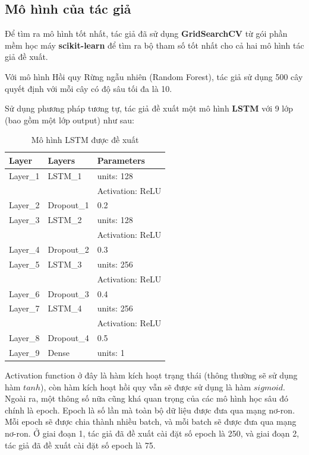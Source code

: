 \subsection{Mô hình của tác giả}
Để tìm ra mô hình tốt nhất, tác giả đã sử dụng \textbf{GridSearchCV} từ gói phần mềm học máy \textbf{scikit-learn} để tìm ra bộ tham số tốt nhất cho cả hai mô hình tác giả đề xuất. 

Với mô hình Hồi quy Rừng ngẫu nhiên (Random Forest), tác giả sử dụng 500 cây quyết định với mỗi cây có độ sâu tối đa là 10. 

Sử dụng phương pháp tương tự, tác giả đề xuất một mô hình \textbf{LSTM} với 9 lớp (bao gồm một lớp output) như sau:

\begin{table}[hbpt]
    \centering
    \begin{tabular}{lll}
    \hline
    Layer & Layers & Parameters \\
    \hline
    Layer\_1 & LSTM\_1 & units: 128 \\
    & & Activation: ReLU \\
    Layer\_2 & Dropout\_1 & 0.2 \\
    Layer\_3 & LSTM\_2 & units: 128 \\
    & & Activation: ReLU \\
    Layer\_4 & Dropout\_2 & 0.3 \\
    Layer\_5 & LSTM\_3 & units: 256 \\
    & & Activation: ReLU \\
    Layer\_6 & Dropout\_3 & 0.4 \\
    Layer\_7 & LSTM\_4 & units: 256 \\
    & & Activation: ReLU \\
    Layer\_8 & Dropout\_4 & 0.5 \\
    Layer\_9 & Dense & units: 1 \\
    \hline
    \end{tabular}
    \caption{Mô hình LSTM được đề xuất}
    \label{tab:nn_architecture}
\end{table}

Activation function ở đây là hàm kích hoạt trạng thái (thông thường sẽ sử dụng hàm $tanh$), còn hàm kích hoạt hồi quy vẫn sẽ được sử dụng là hàm $sigmoid$.
Ngoài ra, một thông số nữa cũng khá quan trọng của các mô hình học sâu đó chính là epoch. Epoch là số lần mà toàn bộ dữ liệu được đưa qua mạng nơ-ron. Mỗi epoch sẽ được chia thành nhiều batch, và mỗi batch sẽ được đưa qua mạng nơ-ron. Ở giai đoạn 1, tác giả đã đề xuất cài đặt số epoch là 250, và giai đoạn 2, tác giả đã đề xuất cài đặt số epoch là 75.

